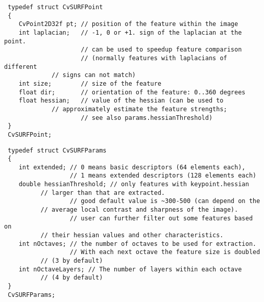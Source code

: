 \begin{description}
\ifC
{}
\begin{lstlisting}
 typedef struct CvSURFPoint
 {
    CvPoint2D32f pt; // position of the feature within the image
    int laplacian;   // -1, 0 or +1. sign of the laplacian at the point.
                     // can be used to speedup feature comparison
                     // (normally features with laplacians of different 
             // signs can not match)
    int size;        // size of the feature
    float dir;       // orientation of the feature: 0..360 degrees
    float hessian;   // value of the hessian (can be used to 
             // approximately estimate the feature strengths;
                     // see also params.hessianThreshold)
 }
 CvSURFPoint;
\end{lstlisting}
\else
{}
\fi
{}
\ifC
{}
\begin{lstlisting}
 typedef struct CvSURFParams
 {
    int extended; // 0 means basic descriptors (64 elements each),
                  // 1 means extended descriptors (128 elements each)
    double hessianThreshold; // only features with keypoint.hessian 
          // larger than that are extracted.
                  // good default value is ~300-500 (can depend on the 
          // average local contrast and sharpness of the image).
                  // user can further filter out some features based on 
          // their hessian values and other characteristics.
    int nOctaves; // the number of octaves to be used for extraction.
                  // With each next octave the feature size is doubled 
          // (3 by default)
    int nOctaveLayers; // The number of layers within each octave 
          // (4 by default)
 }
 CvSURFParams;


\end{lstlisting}
\end{description}

